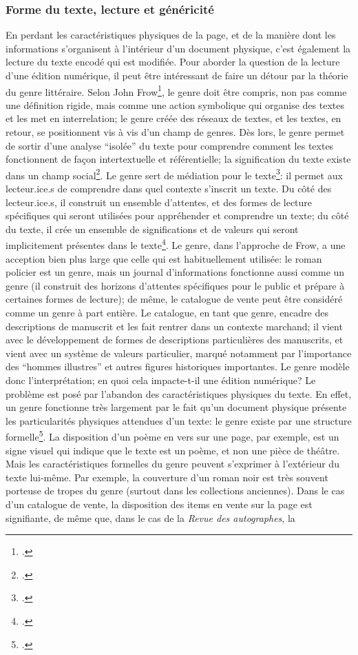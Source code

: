 \subsubsection{Forme du texte, lecture et généricité}
En perdant les caractéristiques physiques de la page, et de la manière dont les informations s'organisent à l'intérieur d'un document physique, c'est également la lecture du texte encodé qui est modifiée. Pour aborder la question de la lecture d'une édition numérique, il peut être intéressant de faire un détour par la théorie du genre littéraire. Selon John Frow\footcite{frow_genre_2006}, le genre doit être compris, non pas comme une définition rigide, mais comme une action symbolique qui organise des textes et les met en interrelation; le genre créée des réseaux de textes, et les textes, en retour, se positionnent vis à vis d'un champ de genres. Dès lors, le genre permet de sortir d'une analyse \enquote{isolée} du texte pour comprendre comment les textes fonctionnent de façon intertextuelle et référentielle; la signification du texte existe dans un champ social\footcite[p. 2, 10]{frow_genre_2006}. Le genre sert de médiation pour le texte\footcite[p. 14]{frow_genre_2006}: il permet aux lecteur.ice.s de comprendre dans quel contexte s'inscrit un texte. Du côté des lecteur.ice.s, il construit un ensemble d'attentes, et des formes de lecture spécifiques qui seront utilisées pour appréhender et comprendre un texte; du côté du texte, il crée un ensemble de significations et de valeurs qui seront implicitement présentes dans le texte\footcite[p. 83-87]{frow_genre_2006}. Le genre, dans l'approche de Frow, a une acception bien plus large que celle qui est habituellement utilisée: le roman policier est un genre, mais un journal d'informations fonctionne aussi comme un genre (il construit des horizons d'attentes spécifiques pour le public et prépare à certaines formes de lecture); de même, le catalogue de vente peut être considéré comme un genre à part entière. Le catalogue, en tant que genre, encadre des descriptions de manuscrit et les fait rentrer dans un contexte marchand; il vient avec le développement de formes de descriptions particulières des manuscrits, et vient avec un système de valeurs particulier, marqué notamment par l'importance des \enquote{hommes illustres} et autres figures historiques importantes. Le genre modèle donc l'interprétation; en quoi cela impacte-t-il une édition numérique? Le problème est posé par l'abandon des caractéristiques physiques du texte. En effet, un genre fonctionne très largement par le fait qu'un document physique présente les particularités physiques attendues d'un texte: le genre existe par une structure formelle\footcite[p. 19]{frow_genre_2006}. La disposition d'un poème en vers sur une page, par exemple, est un signe visuel qui indique que le texte est un poème, et non une pièce de théâtre. Mais les caractéristiques formelles du genre peuvent s'exprimer à l'extérieur du texte lui-même. Par exemple, la couverture d'un roman noir est très souvent porteuse de tropes du genre (surtout dans les collections anciennes). Dans le cas d'un catalogue de vente, la disposition des items en vente sur la page est signifiante, de même que, dans le cas de la \textit{Revue des autographes}, la 